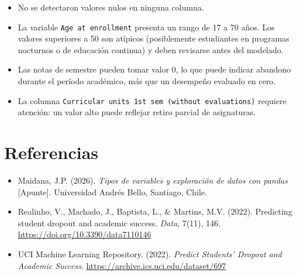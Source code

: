 \documentclass[11pt,a4paper]{article}
\begin{document}
\begin{itemize}
  \item No se detectaron valores nulos en ninguna columna.
  \item La variable \texttt{Age at enrollment} presenta un rango de 17 a 70 años. Los
        valores superiores a 50 son atípicos (posiblemente estudiantes en programas nocturnos
        o de educación continua) y deben revisarse antes del modelado.
  \item Las notas de semestre pueden tomar valor 0, lo que puede indicar abandono durante el
        período académico, más que un desempeño evaluado en cero.
  \item La columna \texttt{Curricular units 1st sem (without evaluations)} requiere
        atención: un valor alto puede reflejar retiro parcial de asignaturas.
\end{itemize}

\section*{Referencias}

\begin{itemize}
  \item Maidana, J.P. (2026). \textit{Tipos de variables y exploración de datos con pandas}
        [Apunte]. Universidad Andrés Bello, Santiago, Chile.
  \item Realinho, V., Machado, J., Baptista, L., \& Martins, M.V. (2022). Predicting student
        dropout and academic success. \textit{Data}, 7(11), 146.
        \url{https://doi.org/10.3390/data7110146}
  \item UCI Machine Learning Repository. (2022). \textit{Predict Students' Dropout and
        Academic Success}. \url{https://archive.ics.uci.edu/dataset/697}
\end{itemize}
\end{document}
